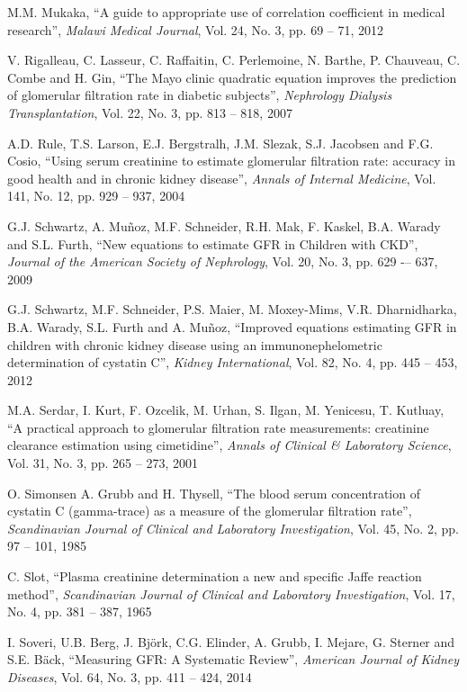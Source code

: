 \documentclass[10pt,final]{siamltex}
\begin{document}
\begin{thebibliography}{99}
   M.M. Mukaka, ``A guide to appropriate use of correlation coefficient in medical research'', \textit{Malawi Medical Journal}, Vol. 24, No. 3, pp. 69 -- 71, 2012

   V. Rigalleau, C. Lasseur, C. Raffaitin, C. Perlemoine, N. Barthe, P. Chauveau, C. Combe and H. Gin, ``The Mayo clinic quadratic equation improves the prediction of glomerular filtration rate in diabetic subjects'', \textit{Nephrology Dialysis Transplantation}, Vol. 22, No. 3, pp. 813 -- 818, 2007

   A.D. Rule, T.S. Larson, E.J. Bergstralh, J.M. Slezak, S.J. Jacobsen and F.G. Cosio, ``Using serum creatinine to estimate glomerular filtration rate: accuracy in good health and in chronic kidney disease'', \textit{Annals of Internal Medicine}, Vol. 141, No. 12, pp. 929 -- 937, 2004

   G.J. Schwartz, A. Mu\~{n}oz, M.F. Schneider, R.H. Mak, F. Kaskel, B.A. Warady and S.L. Furth, ``New equations to estimate GFR in Children with CKD'', \textit{Journal of the American Society of Nephrology}, Vol. 20, No. 3, pp. 629 -– 637, 2009

  G.J. Schwartz, M.F. Schneider, P.S. Maier, M. Moxey-Mims, V.R. Dharnidharka, B.A. Warady, S.L. Furth and A. Mu\~{n}oz, ``Improved equations estimating GFR in children with chronic kidney disease using an immunonephelometric determination of cystatin C'', \textit{Kidney International}, Vol. 82, No. 4, pp. 445 -- 453, 2012

   M.A. Serdar, I. Kurt, F. Ozcelik, M. Urhan, S. Ilgan, M. Yenicesu, T. Kutluay, ``A practical approach to glomerular filtration rate measurements: creatinine clearance estimation using cimetidine'', \textit{Annals of Clinical \& Laboratory Science}, Vol. 31, No. 3, pp. 265 -- 273, 2001

 O. Simonsen A. Grubb and H. Thysell, ``The blood serum concentration of cystatin C (gamma-trace) as a measure of the glomerular filtration rate'', \textit{Scandinavian Journal of Clinical and Laboratory Investigation}, Vol. 45, No. 2, pp. 97 -- 101, 1985

   C. Slot, ``Plasma creatinine determination a new and specific Jaffe reaction method'', \textit{Scandinavian Journal of Clinical and Laboratory Investigation}, Vol. 17, No. 4, pp. 381 -- 387, 1965

   I. Soveri, U.B. Berg, J. Bj\"{o}rk, C.G. Elinder, A. Grubb, I. Mejare, G. Sterner and S.E. B\"{a}ck, ``Measuring GFR: A Systematic Review'', \textit{American Journal of Kidney Diseases}, Vol. 64, No. 3, pp. 411 -- 424, 2014


\end{thebibliography}
\end{document}
